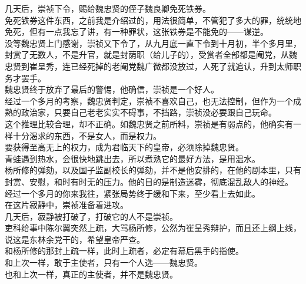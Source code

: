\begin{multicols}{\theparacolNo}
几天后，崇祯下令，赐给魏忠贤的侄子魏良卿免死铁券。\\

免死铁券这件东西，之前我是介绍过的，用法很简单，不管犯了多大的罪，统统地免死，但有一点我忘了讲，有一种罪状，这张铁券是不能免的——谋逆。\\

没等魏忠贤上门感谢，崇祯又下令了，从九月底一直下令到十月初，半个多月里，封赏了无数人，不是升官，就是封荫职（给儿子的），受赏者全部都是阉党，从魏忠贤到崔呈秀，连已经死掉的老阉党魏广微都没放过，人死了就追认，升到太师职务才罢手。\\

魏忠贤终于放弃了最后的警惕，他确信，崇祯是一个好人。\\

经过一个多月的考察，魏忠贤判定，崇祯不喜欢自己，也无法控制，但作为一个成熟的政治家，只要自己老老实实不碍事，不挡路，崇祯没必要跟自己玩命。\\

这个推理比较合理，却不正确。如魏忠贤之前所料，崇祯是有弱点的，他确实有一样十分渴求的东西，不是女人，而是权力。\\

要获得至高无上的权力，成为君临天下的皇帝，必须除掉魏忠贤。\\

青蛙遇到热水，会很快地跳出去，所以煮熟它的最好方法，是用温水。\\

杨所修的弹劾，以及国子监副校长的弹劾，并不是他安排的，在他的剧本里，只有封赏、安慰，和时有时无的压力。他的目的是制造迷雾，彻底混乱敌人的神经。\\

经过一个多月的你来我往，紧张局势终于缓和下来，至少看上去如此。\\

在这片寂静中，崇祯准备着进攻。\\

几天后，寂静被打破了，打破它的人不是崇祯。\\

吏科给事中陈尔翼突然上疏，大骂杨所修，公然为崔呈秀辩护，而且还上纲上线，说这是东林余党干的，希望皇帝严查。\\

和杨所修的那封上疏一样，此时上疏者，必定有幕后黑手的指使。\\

和上次一样，敢于主使者，只有一个人选——魏忠贤。\\

也和上次一样，真正的主使者，并不是魏忠贤。\\


\end{multicols}
